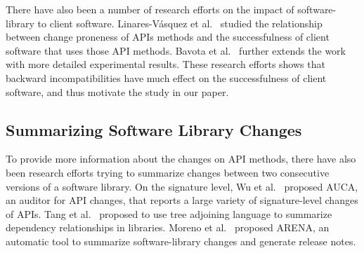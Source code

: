 
There have also been a number of research efforts on the impact of software-library to client software. Linares-Vásquez et al.~\cite{Vasquez:AndroidAPI} studied the relationship between change proneness of APIs methods and the successfulness of client software that uses those API methods. Bavota et al.~\cite{Bavota:AndroidRating} further extends the work with more detailed experimental results. These research efforts shows that backward incompatibilities have much effect on the successfulness of client software, and thus motivate the study in our paper.

\subsection{Summarizing Software Library Changes}



To provide more information about the changes on API methods, there have also been research efforts trying to summarize changes between two consecutive versions of a software library. On the signature level, Wu et al.~\cite{Wu:AUCA} proposed AUCA, an auditor for API changes, that reports a large variety of signature-level changes of APIs. Tang et al.~\cite{Tang2015} proposed to use tree adjoining language to summarize dependency relationships in libraries. Moreno et al.~\cite{Moreno:ARENA} proposed ARENA, an automatic tool to summarize software-library changes and generate release notes. 

